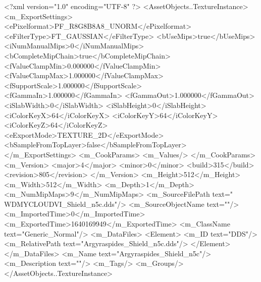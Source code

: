 <?xml version="1.0" encoding="UTF-8" ?>
<AssetObjects..TextureInstance>
	<m_ExportSettings>
		<ePixelformat>PF_R8G8B8A8_UNORM</ePixelformat>
		<eFilterType>FT_GAUSSIAN</eFilterType>
		<bUseMips>true</bUseMips>
		<iNumManualMips>0</iNumManualMips>
		<bCompleteMipChain>true</bCompleteMipChain>
		<fValueClampMin>0.000000</fValueClampMin>
		<fValueClampMax>1.000000</fValueClampMax>
		<fSupportScale>1.000000</fSupportScale>
		<fGammaIn>1.000000</fGammaIn>
		<fGammaOut>1.000000</fGammaOut>
		<iSlabWidth>0</iSlabWidth>
		<iSlabHeight>0</iSlabHeight>
		<iColorKeyX>64</iColorKeyX>
		<iColorKeyY>64</iColorKeyY>
		<iColorKeyZ>64</iColorKeyZ>
		<eExportMode>TEXTURE_2D</eExportMode>
		<bSampleFromTopLayer>false</bSampleFromTopLayer>
	</m_ExportSettings>
	<m_CookParams>
		<m_Values/>
	</m_CookParams>
	<m_Version>
		<major>4</major>
		<minor>0</minor>
		<build>315</build>
		<revision>805</revision>
	</m_Version>
	<m_Height>512</m_Height>
	<m_Width>512</m_Width>
	<m_Depth>1</m_Depth>
	<m_NumMipMaps>9</m_NumMipMaps>
	<m_SourceFilePath text="\\WDMYCLOUD\Sam\Projects\Modding\Civ VI\Civilizations\Seleucid\Textures\Argyraspides_Shield_n5c.dds"/>
	<m_SourceObjectName text=""/>
	<m_ImportedTime>0</m_ImportedTime>
	<m_ExportedTime>1640169949</m_ExportedTime>
	<m_ClassName text="Generic_Normal"/>
	<m_DataFiles>
		<Element>
			<m_ID text="DDS"/>
			<m_RelativePath text="Argyraspides_Shield_n5c.dds"/>
		</Element>
	</m_DataFiles>
	<m_Name text="Argyraspides_Shield_n5c"/>
	<m_Description text=""/>
	<m_Tags/>
	<m_Groups/>
</AssetObjects..TextureInstance>

